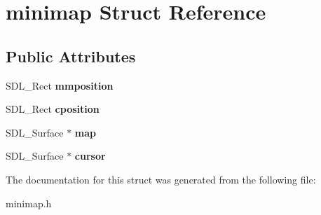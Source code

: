 \hypertarget{structminimap}{}\section{minimap Struct Reference}
\label{structminimap}
\subsection*{Public Attributes}
\begin{DoxyCompactItemize}
\item 
\mbox{\label{structminimap_a8974d07a7197a9d0537fee5356f029c6}} 
S\+D\+L\+\_\+\+Rect {\bfseries mmposition}
\item 
\mbox{\label{structminimap_a1a17c4f995c7a9e5e0f794f81adee152}} 
S\+D\+L\+\_\+\+Rect {\bfseries cposition}
\item 
\mbox{\label{structminimap_a7d46df6520f150bfcd6223dc171e853f}} 
S\+D\+L\+\_\+\+Surface $\ast$ {\bfseries map}
\item 
\mbox{\label{structminimap_a56797e5abf00521708d37298ef782736}} 
S\+D\+L\+\_\+\+Surface $\ast$ {\bfseries cursor}
\end{DoxyCompactItemize}


The documentation for this struct was generated from the following file\+:\begin{DoxyCompactItemize}
\item 
minimap.\+h\end{DoxyCompactItemize}
